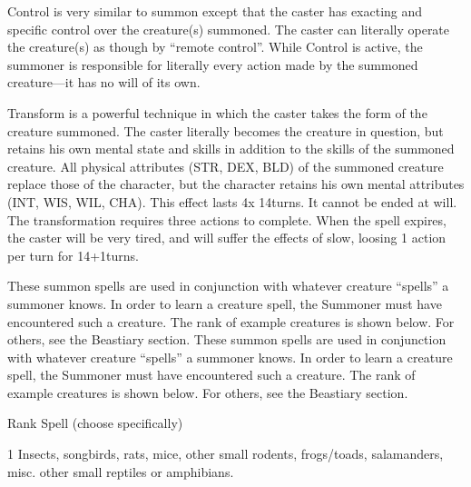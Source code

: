 \documentclass[twoside]{book}
\begin{document}
              
                  Control   is very similar to
                  summon except that the caster has exacting and specific
                  control over the creature(s) summoned. The caster can
                  literally operate the creature(s) as though by
                  “remote control”. While Control is active,
                  the summoner is responsible for literally every action
                  made by the summoned creature—it has no will of
                  its own.
                
              
                  Transform   is a powerful
                  technique in which the caster takes the form of the
                  creature summoned. The caster literally becomes the
                  creature in question, but retains his own mental state
                  and skills in addition to the skills of the summoned
                  creature. All physical attributes (STR, DEX, BLD) of
                  the summoned creature replace those of the character,
                  but the character retains his own mental attributes
                  (INT, WIS, WIL, CHA). This effect lasts 4x 14turns.
                  It cannot be ended at will. The transformation requires
                  three actions to complete. When the spell expires, the
                  caster will be very tired, and will suffer the effects
                  of slow, loosing 1 action per turn for 14+1turns.
                
              These summon spells are used in conjunction with
               whatever creature “spells” a summoner knows.
               In order to learn a creature spell, the Summoner must have
               encountered such a creature. The rank of example creatures
               is shown below. For others, see the Beastiary section.
                 These summon spells are used in conjunction with
               whatever creature “spells” a summoner knows.
               In order to learn a creature spell, the Summoner must have
               encountered such a creature. The rank of example creatures
               is shown below. For others, see the Beastiary section.
                 
                
                  
                   Rank   
                     Spell (choose specifically)
                     
                  
                  
                   1   
                     Insects, songbirds, rats, mice, other small
                     rodents, frogs/toads, salamanders, misc. other small
                     reptiles or amphibians. 
                  
\end{document}

